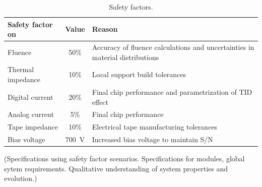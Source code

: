 \begin{table}[htb]
\caption{Safety factors.}
\label{tab:safetyfactors}
\centering
\begin{tabular}{lcl}
Safety factor on & Value & Reason \\
\hline
Fluence  & 50\% & Accuracy of fluence calculations and uncertainties in material distributions\\
Thermal impedance & 10\% & Local support build tolerances\\
Digital current & 20\% & Final chip performance and parametrization of TID effect\\
Analog current & 5\% & Final chip performance\\
Tape impedance & 10\% & Electrical tape manufacturing tolerances\\
Bias voltage & 700~V & Increased bias voltage to maintain S/N\\
\end{tabular}
\end{table}

(Specifications using safety factor scenarios. Specifications for modules, global sytem requirements.
Qualitative understanding of system properties and evolution.)

